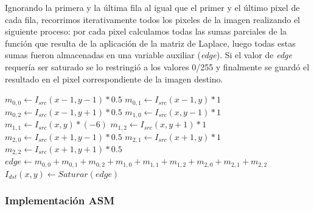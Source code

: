 Ignorando la primera y la última fila al igual que el primer y el último pixel de cada fila, recorrimos iterativamente todos los pixeles de la imagen realizando el siguiente proceso: por cada pixel calculamos todas las sumas parciales de la función que resulta de la aplicación de la matriz de Laplace, luego todas estas sumas fueron almacenadas en una variable auxiliar (\textit{edge}). Si el valor de \textit{edge} requería ser saturado se lo restringió a los valores 0/255 y finalmente se guardó el resultado en el pixel correspondiente de la imagen destino.

\begin{algorithm}[H]
  \begin{algorithmic}[1]
			  \STATE $m_{0,0} \gets I_{src}(x-1,y-1)*0.5$
			  \STATE $m_{0,1} \gets I_{src}(x-1,y)*1$
			  \STATE $m_{0,2} \gets I_{src}(x-1,y+1)*0.5$
			  \STATE $m_{1,0} \gets I_{src}(x,y-1)*1$
			  \STATE $m_{1,1} \gets I_{src}(x,y)*(-6)$
			  \STATE $m_{1,2} \gets I_{src}(x,y+1)*1$
			  \STATE $m_{2,0} \gets I_{src}(x+1,y-1)*0.5$
			  \STATE $m_{2,1} \gets I_{src}(x+1,y)*1$
			  \STATE $m_{2,2} \gets I_{src}(x+1,y+1)*0.5$
			  \STATE $edge \gets m_{0,0}+m_{0,1}+m_{0,2}+m_{1,0}+m_{1,1}+m_{1,2}+m_{2,0}+m_{2,1}+m_{2,2}$
			  \STATE $I_{dst}(x,y) \gets Saturar(edge)$
			\ENDFOR
		 \ENDFOR
  \end{algorithmic}
  \caption{$edge (I_{src}, I_{dst})$}
  \label{alg:edge}
\end{algorithm}

\subsubsection{Implementación ASM}